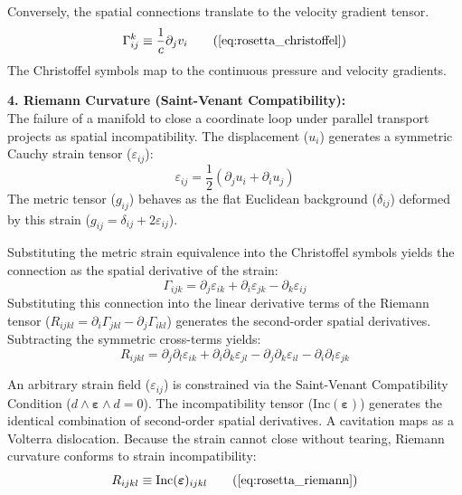 Conversely, the spatial connections translate to the velocity gradient tensor. 
\begin{equation}
    \Gamma^k_{ij} \equiv \frac{1}{c} \partial_j v_i \tag{\ref{eq:rosetta_christoffel}}
\end{equation}
The Christoffel symbols map to the continuous pressure and velocity gradients.

\vspace{0.2 cm}

\textbf{4. Riemann Curvature (Saint-Venant Compatibility):} \\
The failure of a manifold to close a coordinate loop under parallel transport projects as spatial incompatibility. The displacement ($u_i$) generates a symmetric Cauchy strain tensor ($\varepsilon_{ij}$):
\begin{equation}
    \varepsilon_{ij} = \frac{1}{2}(\partial_j u_i + \partial_i u_j) 
\end{equation}
The metric tensor ($g_{ij}$) behaves as the flat Euclidean background ($\delta_{ij}$) deformed by this strain ($g_{ij} = \delta_{ij} + 2\varepsilon_{ij}$). 

Substituting the metric strain equivalence into the Christoffel symbols yields the connection as the spatial derivative of the strain:
\begin{equation}
    \Gamma_{ijk} = \partial_j \varepsilon_{ik} + \partial_i \varepsilon_{jk} - \partial_k \varepsilon_{ij} 
\end{equation}
Substituting this connection into the linear derivative terms of the Riemann tensor ($R_{ijkl} = \partial_i \Gamma_{jkl} - \partial_j \Gamma_{ikl}$) generates the second-order spatial derivatives. Subtracting the symmetric cross-terms yields:
\begin{equation}
    R_{ijkl} = \partial_j \partial_l \varepsilon_{ik} + \partial_i \partial_k \varepsilon_{jl} - \partial_j \partial_k \varepsilon_{il} - \partial_i \partial_l \varepsilon_{jk} \nonumber
\end{equation}

An arbitrary strain field ($\varepsilon_{ij}$) is constrained via the Saint-Venant Compatibility Condition ($d \wedge \boldsymbol{\varepsilon} \wedge d = 0$). The incompatibility tensor ($\text{Inc}(\boldsymbol{\varepsilon})$) generates the identical combination of second-order spatial derivatives. A cavitation maps as a Volterra dislocation. Because the strain cannot close without tearing, Riemann curvature conforms to strain incompatibility: 
\begin{equation}
    R_{ijkl} \equiv \text{Inc}(\boldsymbol{\varepsilon})_{ijkl} \tag{\ref{eq:rosetta_riemann}}
\end{equation}

